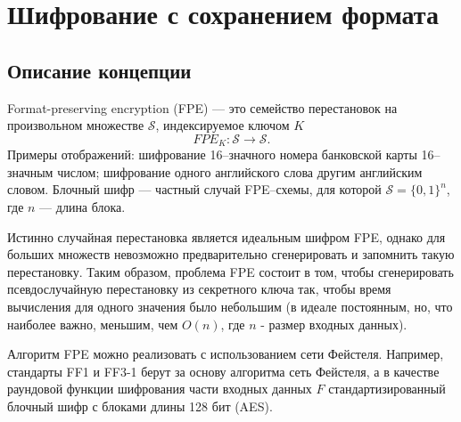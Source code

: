 \documentclass[utf8x, 14pt]{G7-32} %
\begin{document}
\frontmatter %

\maketitle %


\begin{executors}
\end{executors}

\tableofcontents %
 



\mainmatter %

\chapter{Шифрование с сохранением формата}

\section{Описание концепции}
Format-preserving encryption (FPE) --- это семейство перестановок на произвольном множестве $\mathcal{S}$, индексируемое ключом $K$ \cite{ruscrypto}
$$FPE_K: \mathcal{S} \to \mathcal{S}.$$
 Примеры отображений: шифрование 16--значного номера банковской карты 16--значным числом; шифрование одного английского слова другим английским словом. Блочный шифр --- частный случай FPE--схемы, для которой  $\mathcal{S} = \{0,1\}^n$, где $n$ --- длина блока.


Истинно случайная перестановка является идеальным шифром FPE, однако для больших множеств невозможно предварительно сгенерировать и запомнить такую перестановку. Таким образом, проблема FPE состоит в том, чтобы сгенерировать псевдослучайную перестановку из секретного ключа так, чтобы время вычисления для одного значения было небольшим (в идеале постоянным, но, что наиболее важно, меньшим, чем $O(n)$, где $n$ - размер входных данных).


Алгоритм FPE можно реализовать с использованием сети Фейстеля. Например, стандарты FF1 и FF3-1 \cite{FF13-1} берут за основу алгоритма сеть Фейстеля, а в качестве раундовой функции шифрования части входных данных $F$ стандартизированный блочный шифр с блоками длины 128 бит (AES).
\end{document}
